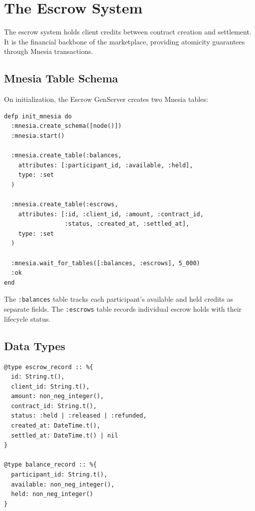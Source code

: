\documentclass[12pt,a4paper]{article}
\theoremstyle{plain}
\theoremstyle{definition}
\begin{document}
\section{The Escrow System}\label{sec:escrow}

The escrow system holds client credits between contract creation and settlement. It is the financial backbone of the marketplace, providing atomicity guarantees through Mnesia transactions.

\subsection{Mnesia Table Schema}

On initialization, the Escrow GenServer creates two Mnesia tables:

\begin{lstlisting}[caption={Mnesia table initialization},label={lst:escrow-mnesia}]
defp init_mnesia do
  :mnesia.create_schema([node()])
  :mnesia.start()

  :mnesia.create_table(:balances,
    attributes: [:participant_id, :available, :held],
    type: :set
  )

  :mnesia.create_table(:escrows,
    attributes: [:id, :client_id, :amount, :contract_id,
                 :status, :created_at, :settled_at],
    type: :set
  )

  :mnesia.wait_for_tables([:balances, :escrows], 5_000)
  :ok
end
\end{lstlisting}

The \texttt{:balances} table tracks each participant's available and held credits as separate fields. The \texttt{:escrows} table records individual escrow holds with their lifecycle status.

\subsection{Data Types}

\begin{lstlisting}[caption={Escrow types},label={lst:escrow-types}]
@type escrow_record :: %{
  id: String.t(),
  client_id: String.t(),
  amount: non_neg_integer(),
  contract_id: String.t(),
  status: :held | :released | :refunded,
  created_at: DateTime.t(),
  settled_at: DateTime.t() | nil
}

@type balance_record :: %{
  participant_id: String.t(),
  available: non_neg_integer(),
  held: non_neg_integer()
}
\end{lstlisting}
\end{document}
